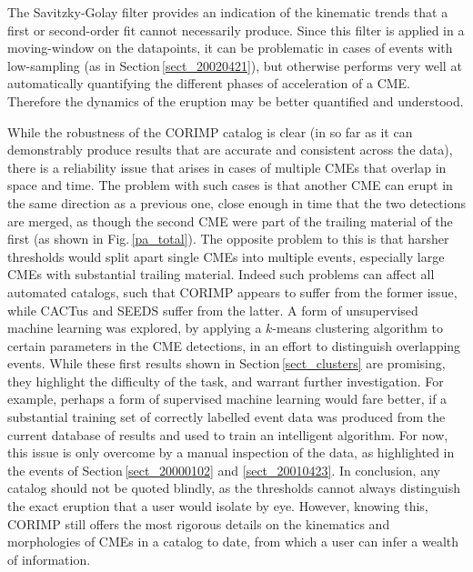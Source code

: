 \documentclass[referee,a4paper,12pt,traditabstract]{swsc}
\begin{document}
The Savitzky-Golay filter provides an indication of the kinematic trends that a first or second-order fit cannot necessarily produce. Since this filter is applied in a moving-window on the datapoints, it can be problematic in cases of events with low-sampling (as in Section\,\ref{sect_20020421}), but otherwise performs very well at automatically quantifying the different phases of acceleration of a CME. Therefore the dynamics of the eruption may be better quantified and understood.  

While the robustness of the CORIMP catalog is clear (in so far as it can demonstrably produce results that are accurate and consistent across the data), there is a reliability issue that arises in cases of multiple CMEs that overlap in space and time. The problem with such cases is that another CME can erupt in the same direction as a previous one, close enough in time that the two detections are merged, as though the second CME were part of the trailing material of the first (as shown in Fig.\,\ref{pa_total}). The opposite problem to this is that harsher thresholds would split apart single CMEs into multiple events, especially large CMEs with substantial trailing material. Indeed such problems can affect all automated catalogs, such that CORIMP appears to suffer from the former issue, while CACTus and SEEDS suffer from the latter. A form of unsupervised machine learning was explored, by applying a $k$-means clustering algorithm to certain parameters in the CME detections, in an effort to distinguish overlapping events. While these first results shown in Section\,\ref{sect_clusters} are promising, they highlight the difficulty of the task, and warrant further investigation. For example, perhaps a form of supervised machine learning would fare better, if a substantial training set of correctly labelled event data was produced from the current database of results and used to train an intelligent algorithm. For now, this issue is only overcome by a manual inspection of the data, as highlighted in the events of Section\,\ref{sect_20000102} and \ref{sect_20010423}. In conclusion, any catalog should not be quoted blindly, as the thresholds cannot always distinguish the exact eruption that a user would isolate by eye. However, knowing this, CORIMP still offers the most rigorous details on the kinematics and morphologies of CMEs in a catalog to date, from which a user can infer a wealth of information.
\end{document}
